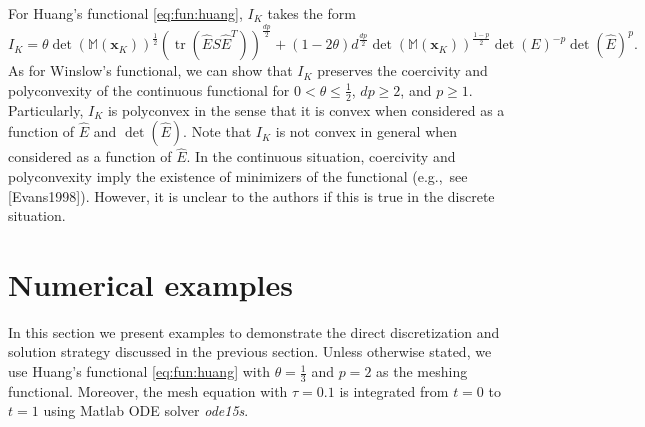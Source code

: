 \documentclass[american]{scrartcl}
\providecommand{\V}[1]{\boldsymbol{#1}}
\providecommand{\M}{\mathbb{M}}
\theoremstyle{remark}
\begin{document}
For Huang's functional \cref{eq:fun:huang}, $I_K$ takes the form
\begin{equation}
   I_K = \theta \det{(\M(\V{x}_K))}^{\frac{1}{2}} {(\operatorname{tr}(\hat{E} S \hat{E}^T))}^{\frac{d p}{2}}
   + (1-2\theta) d^{\frac{d p}{2}} \det{(\M(\V{x}_K))}^{\frac{1-p}{2}} \det{(E)}^{-p} \det{(\hat{E})}^p .
   \label{eq:huang:3}
\end{equation}
As for Winslow's functional, we can show that $I_K$ preserves the coercivity and polyconvexity of the continuous functional for $0 < \theta \le \frac{1}{2}$, $dp \ge 2$,  and $p \ge 1$.
Particularly, $I_K$ is polyconvex in the sense that it is convex when considered as a function of $\hat{E}$ and $\det(\hat{E})$.
Note that $I_K$ is not convex in general when considered as a function of $\hat{E}$.
In the continuous situation, coercivity and polyconvexity imply the existence of minimizers of the functional (e.g.,\ see [Evans1998]).
However, it is unclear to the authors if this is true in the discrete situation.

\section{Numerical examples}
\label{sect:numerics}

In this section we present examples to demonstrate the direct discretization and solution strategy discussed in the previous section.
Unless otherwise stated, we use Huang's functional \cref{eq:fun:huang} with $\theta = \frac{1}{3}$ and $p=2$ as the meshing functional.
Moreover, the mesh equation with $\tau = 0.1$ is integrated from $t = 0$ to $t=1$ using Matlab ODE solver \emph{ode15s}.
\end{document}
